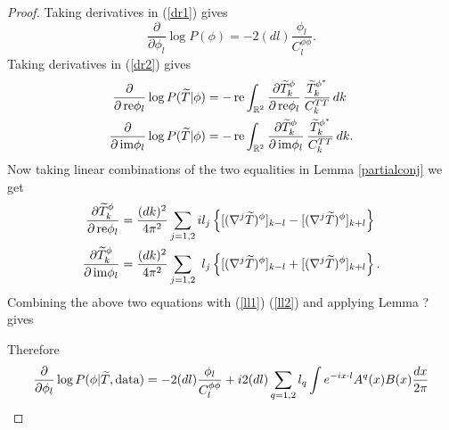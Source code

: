 \documentclass[noinfoline]{imsart}
\newcommand{\re}{\text{\,\rm re}}
\newcommand{\im}{\text{\,\rm im}}
\begin{document}
\begin{proof}
Taking derivatives in (\ref{dr1}) gives
\begin{equation}
\label{grad of prior}
\frac{\partial}{\partial \phi_l}\log P(\phi) = - 2(dl) \frac{\phi_l}{C^{\phi\phi}_{l}}.
\end{equation}
Taking derivatives in (\ref{dr2}) gives
\begin{align}
\frac{\partial}{\partial \re\phi_l}\log P(\widetilde T| \phi) 
&= - \re \int_{\Bbb R^2} \frac{\partial \widetilde T_k^\phi}{\partial \re\phi_l} \, \frac{\widetilde T_k^{\phi^*}}{C_k^{TT}}  \,dk \label{ll1}\\
\frac{\partial}{\partial \im\phi_l}\log P(\widetilde T| \phi) 
&=  -\re \int_{\Bbb R^2}\frac{\partial \widetilde T_k^\phi}{\partial \im\phi_l} \, \frac{\widetilde T_k^{\phi^*}}{C_k^{TT}} \, dk \label{ll2}.
\end{align}
Now taking linear combinations of the two equalities in Lemma \ref{partialconj} we get
\begin{align}
\frac{\partial \widetilde T^\phi_k}{\partial \re \phi_{l}}  &= \frac{(dk)^2}{4 \pi^2}  \sum_{j=1,2} il_j\left\{ [(\nabla^j\widetilde T)^\phi]_{k-l}  -   [(\nabla^j\widetilde T)^\phi]_{k+l}  \right\}\\
\frac{\partial \widetilde T^\phi_k}{\partial \im \phi_{l} }  &= \frac{ (dk)^2}{4 \pi^2} \sum_{j=1,2} \phantom{i}l_j\left\{ [(\nabla^j\widetilde T)^\phi]_{k-l}  +   [(\nabla^j\widetilde T)^\phi]_{k+l}  \right\}.
\end{align}
Combining the above two equations with  (\ref{ll1}) (\ref{ll2}) and applying Lemma ? gives




Therefore
\[\frac{\partial}{\partial \phi_l}\log P(\phi | \widetilde T,  \text{\rm data}) = - 2(dl) \frac{\phi_l}{C^{\phi\phi}_{l}} +  i 2(dl) \sum_{q=1,2} l_q \int e^{-i x\cdot l} A^q(x)B(x) \frac{dx}{2\pi}   \]

\end{proof}
\end{document}
